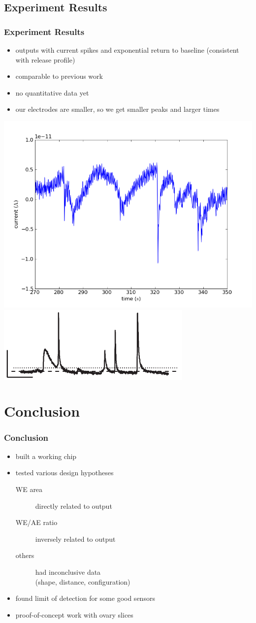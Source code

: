 \documentclass[10pt]{beamer}
\begin{document}
\subsection{Experiment Results}
\begin{frame}
	\frametitle{Experiment Results}
	\begin{itemize}
		\item outputs with current spikes and exponential return to baseline (consistent with release profile)
		\item comparable to previous work
		\item no quantitative data yet
		\item our electrodes are smaller, so we get smaller peaks and larger times
	\end{itemize}
	\includegraphics[width=0.5\linewidth]{figures/216.png}
	\includegraphics[width=0.5\linewidth]{figures/mosharok-pulse.png}
\end{frame}

\section{Conclusion}
\begin{frame}
	\frametitle{Conclusion}
	\begin{itemize}
		\item built a working chip
		\item tested various design hypotheses
			\begin{description}
				\item[WE area] directly related to output
				\item[WE/AE ratio] inversely related to output
				\item[others] had inconclusive data \\ (shape, distance, configuration)
			\end{description}
		\item found limit of detection for some good sensors
		\item proof-of-concept work with ovary slices
	\end{itemize}
\end{frame}
\end{document}
